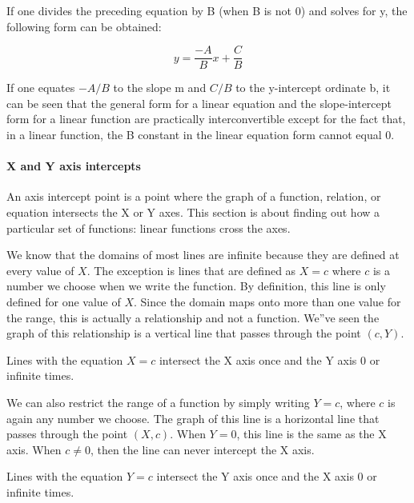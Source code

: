 If one divides the preceding equation by B (when B is not 0) and solves for y, the following form can be obtained:



$$ y = \frac{-A}{B} x + \frac{C}{B} $$



If one equates $-A/B$ to the slope m and $C/B$ to the y-intercept ordinate b, it can be seen that the general form for a linear equation and the slope-intercept form for a linear function are practically interconvertible except for the fact that, in a linear function, the B constant in the linear equation form cannot equal 0.



\paragraph{X and Y axis intercepts}



An axis intercept point is a point where the graph of a function, relation, or equation intersects the X or Y axes. This section is about finding out how a particular set of functions: linear functions cross the axes.



We know that the domains of most lines are infinite because they are defined at every value of $X$. The exception is lines that are defined as $X = c$ where $c$ is a number we choose when we write the function. By definition, this line is only defined for one value of $X$. Since the domain maps onto more than one value for the range, this is actually a relationship and not a function. We''ve seen the graph of this relationship is a vertical line that passes through the point $(c,Y)$.



Lines with the equation $X = c$ intersect the X axis once and the Y axis 0 or infinite times.



We can also restrict the range of a function by simply writing $Y = c$, where $c$ is again any number we choose. The graph of this line is a horizontal line that passes through the point $(X, c)$. When $Y = 0$, this line is the same as the X axis. When $c \neq 0$, then the line can never intercept the X axis.



Lines with the equation $Y = c$ intersect the Y axis once and the X axis 0 or infinite times.



